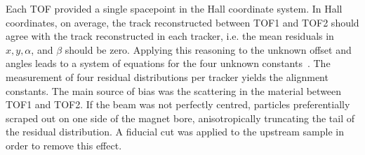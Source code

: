 Each TOF provided a single spacepoint in the Hall coordinate system.
In Hall coordinates, on average, the track reconstructed between
TOF1 and TOF2 should agree with the track reconstructed in each 
tracker, i.e. the mean residuals in $x, y, \alpha$, and $\beta$
should be zero. 
Applying this reasoning to the unknown offset and angles leads to a
system of equations for the four unknown
constants~\cite{2018arXiv1805.06623T}.
The measurement of four residual distributions per tracker yields the
alignment constants. 
The main source of bias was the scattering in the material between
TOF1 and TOF2.
If the beam was not perfectly centred, particles preferentially
scraped out on one side of the magnet bore, anisotropically truncating
the tail of the residual distribution. 
A fiducial cut was applied to the upstream sample in order to remove
this effect.


